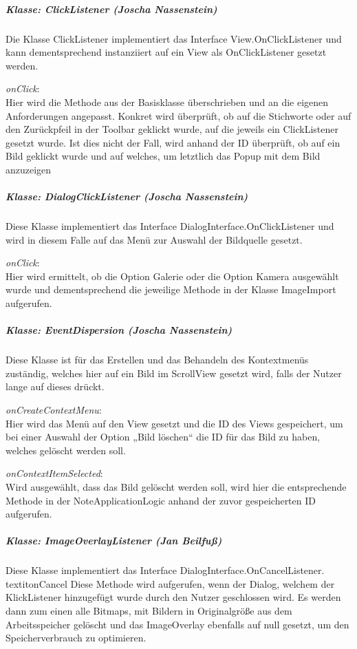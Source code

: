 \subparagraph*{Klasse: ClickListener (Joscha Nassenstein)}
Die Klasse ClickListener implementiert das Interface View.OnClickListener und kann dementsprechend instanziiert auf ein View als OnClickListener gesetzt werden.

\textit{onClick}:\\
Hier wird die Methode aus der Basisklasse überschrieben und an die eigenen Anforderungen angepasst. Konkret wird überprüft, ob auf die Stichworte oder auf den Zurückpfeil in der Toolbar geklickt wurde, auf die jeweils ein ClickListener gesetzt wurde. Ist dies nicht der Fall, wird anhand der ID überprüft, ob auf ein Bild geklickt wurde und auf welches, um letztlich das Popup mit dem Bild anzuzeigen

\subparagraph*{Klasse: DialogClickListener (Joscha Nassenstein)}
Diese Klasse implementiert das Interface DialogInterface.OnClickListener und wird in diesem Falle auf das Menü zur Auswahl der Bildquelle gesetzt.

\textit{onClick}:\\
Hier wird ermittelt, ob die Option Galerie oder die Option Kamera ausgewählt wurde und dementsprechend die jeweilige Methode in der Klasse ImageImport aufgerufen.

\subparagraph*{Klasse: EventDispersion (Joscha Nassenstein)}
Diese Klasse ist für das Erstellen und das Behandeln des Kontextmenüs zuständig, welches hier auf ein Bild im ScrollView gesetzt wird, falls der Nutzer lange auf dieses drückt.

\textit{onCreateContextMenu}:\\
Hier wird das Menü auf den View gesetzt und die ID des Views gespeichert, um bei einer Auswahl der Option „Bild löschen“ die ID für das Bild zu haben, welches gelöscht werden soll.

\textit{onContextItemSelected}:\\
Wird ausgewählt, dass das Bild gelöscht werden soll, wird hier die entsprechende Methode in der NoteApplicationLogic anhand der zuvor gespeicherten ID aufgerufen.

\subparagraph*{Klasse: ImageOverlayListener (Jan Beilfuß)}
Diese Klasse implementiert das Interface DialogInterface.OnCancelListener.
textit{onCancel}
Diese Methode wird aufgerufen, wenn der Dialog, welchem der KlickListener hinzugefügt wurde durch den Nutzer geschlossen wird. Es werden dann zum einen alle Bitmaps, mit Bildern in Originalgröße aus dem Arbeitsspeicher gelöscht und das ImageOverlay ebenfalls auf null gesetzt, um den Speicherverbrauch zu optimieren.

